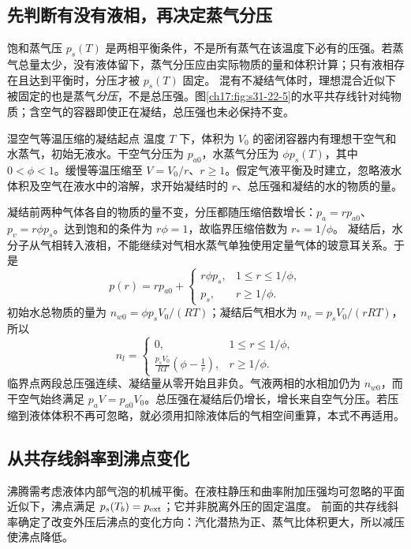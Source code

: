 {\subsection{先判断有没有液相，再决定蒸气分压}
饱和蒸气压 $p_s(T)$ 是两相平衡条件，不是所有蒸气在该温度下必有的压强。若蒸气总量太少，没有液体留下，蒸气分压应由实际物质的量和体积计算；只有液相存在且达到平衡时，分压才被 $p_s(T)$ 固定。
混有不凝结气体时，理想混合近似下被固定的也是蒸气\emph{分压}，不是总压强。图\ref{ch17:fig:s31-22-5}的水平共存线针对纯物质；含空气的容器即使正在凝结，总压强也未必保持不变。

\Needspace{180pt}
\begin{origexamplebox}{湿空气等温压缩的凝结起点}\label{ch17:ex:teaching-condensation}
温度 $T$ 下，体积为 $V_0$ 的密闭容器内有理想干空气和水蒸气，初始无液水。干空气分压为 $p_{a0}$，水蒸气分压为 $\phi p_s(T)$，其中 $0<\phi<1$。缓慢等温压缩至 $V=V_0/r$、$r\ge1$。假定气液平衡及时建立，忽略液水体积及空气在液水中的溶解，求开始凝结时的 $r$、总压强和凝结的水的物质的量。

\ThQCondensation
\end{origexamplebox}
\Needspace{65pt}
\begin{xesolution}
\ThACondensation

凝结前两种气体各自的物质的量不变，分压都随压缩倍数增长：$p_a=rp_{a0}$、$p_v=r\phi p_s$。达到饱和的条件为 $r\phi=1$，故临界压缩倍数为 $r_*=1/\phi$。
凝结后，水分子从气相转入液相，不能继续对气相水蒸气单独使用定量气体的玻意耳关系。于是
\[
 p(r)=rp_{a0}+\begin{cases}r\phi p_s,&1\le r\le1/\phi,\\p_s,&r\ge1/\phi.\end{cases}
\]
初始水总物质的量为 $n_{w0}=\phi p_sV_0/(RT)$；凝结后气相水为 $n_v=p_sV_0/(rRT)$，所以
\[
 n_l=\begin{cases}0,&1\le r\le1/\phi,\\
 \displaystyle\frac{p_sV_0}{RT}\left(\phi-\frac1r\right),&r\ge1/\phi.
 \end{cases}
\]
临界点两段总压强连续、凝结量从零开始且非负。气液两相的水相加仍为 $n_{w0}$，而干空气始终满足 $p_aV=p_{a0}V_0$。总压强在凝结后仍增长，增长来自空气分压。若压缩到液体体积不再可忽略，就必须用扣除液体后的气相空间重算，本式不再适用。
\end{xesolution}

\subsection{从共存线斜率到沸点变化}
沸腾需考虑液体内部气泡的机械平衡。在液柱静压和曲率附加压强均可忽略的平面近似下，沸点满足 $p_s(T_b)=p_{\rm ext}$；它并非脱离外压的固定温度。
前面的共存线斜率确定了改变外压后沸点的变化方向：汽化潜热为正、蒸气比体积更大，所以减压使沸点降低。

}

